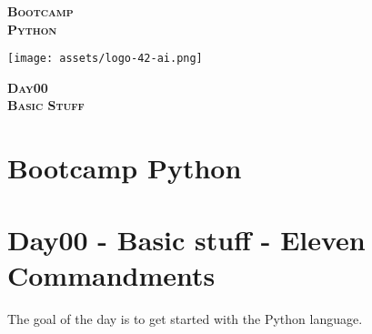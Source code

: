 \documentclass[]{article}
\date{}
\begin{document}

\vspace*{2cm}
\begin{center}
    \textsc{\fontsize{40}{48} \bfseries Bootcamp}\\[0.6cm]
    \textsc{\fontsize{39}{48} \bfseries { %
Python
    }}\\[0.3cm]
\end{center}
\vspace{3cm}

\begin{center}
\texttt{[image: assets/logo-42-ai.png]}{\centering}
\end{center}

\vspace*{2cm}
\begin{center}
    \textsc{\fontsize{32}{48} \bfseries %
Day00    
    }\\[0.6cm]
    \textsc{\fontsize{32}{48} \bfseries %
Basic Stuff    
    }\\[0.3cm]
\end{center}
\vspace{3cm}

\newpage

\setcounter{page}{1}



\hypertarget{bootcamp-python}{%
\section{Bootcamp Python}\label{bootcamp-python}}

\hypertarget{day00---basic-stuff---eleven-commandments}{%
\section{Day00 - Basic stuff - Eleven
Commandments}\label{day00---basic-stuff---eleven-commandments}}

The goal of the day is to get started with the Python language.
\end{document}
